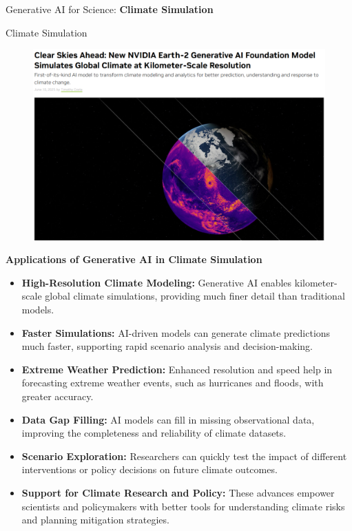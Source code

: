 \begin{frame}{}
    \LARGE Generative AI for Science: \textbf{Climate Simulation}
\end{frame}

\begin{frame}[allowframebreaks]{Climate Simulation}
    \begin{figure}
        \centering
        \includegraphics[height=0.9\textheight,width=1\textwidth,keepaspectratio]{images/science/climate-sim-cover.png}
    \end{figure}

    \framebreak

    \textbf{Applications of Generative AI in Climate Simulation}
    \begin{itemize}
        \item \textbf{High-Resolution Climate Modeling:} Generative AI enables kilometer-scale global climate simulations, providing much finer detail than traditional models.
        \item \textbf{Faster Simulations:} AI-driven models can generate climate predictions much faster, supporting rapid scenario analysis and decision-making.
        \item \textbf{Extreme Weather Prediction:} Enhanced resolution and speed help in forecasting extreme weather events, such as hurricanes and floods, with greater accuracy.
        \item \textbf{Data Gap Filling:} AI models can fill in missing observational data, improving the completeness and reliability of climate datasets.
        \item \textbf{Scenario Exploration:} Researchers can quickly test the impact of different interventions or policy decisions on future climate outcomes.
        \item \textbf{Support for Climate Research and Policy:} These advances empower scientists and policymakers with better tools for understanding climate risks and planning mitigation strategies.
    \end{itemize}


\end{frame}
